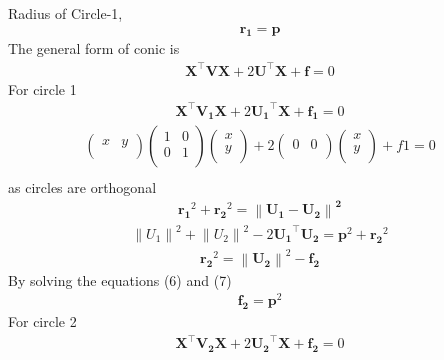 \documentclass[10pt,a4paper]{report}
\providecommand{\norm}[1]{\left\lVert#1\right\rVert}
\let\vec\mathbf
\begin{document}
\begin{multicols}{2}
Radius of Circle-1,
\begin{align}
\vec{r_1=p}
\end{align}
The general form of conic is
\begin{align}
\vec{X}^{\top}\vec{V}\vec{X}+2\vec{U}^{\top}\vec{X}+\vec{f}=0
\end{align}
For circle 1  \\
\begin{align}
\vec{X}^{\top}\vec{V_1}\vec{X}+2\vec{U_1}^{\top}\vec{X}+\vec{f_1}=0
\end{align}
\begin{align}
\begin{pmatrix}x & y \\ \end{pmatrix} 
\begin{pmatrix}
1 & 0\\ 0 & 1 \\
\end{pmatrix}
\begin{pmatrix}x \\ y \\ \end{pmatrix}+2
\begin{pmatrix}0 & 0 \\ \end{pmatrix}
\begin{pmatrix}x \\ y \\ \end{pmatrix}+f1=0 \\
\end{align}
as circles are orthogonal 
\begin{align}
\vec{r_1}^2+\vec{r_2}^2=\vec{\norm{U_1-U_2}^2}
\end{align}
\begin{align}
\norm{U_1}^2+\norm{U_2}^2-2\vec{U_1}^{\top}\vec{U_2}=\vec{p}^2+\vec{r_2}^2
\end{align}
\begin{align}
\vec{r_2}^2=\vec{\norm{U_2}}^2-\vec{f_2}
\end{align}
By solving the equations (6) and (7)
\begin{align}
\vec{f_2}=\vec{p}^2
\end{align}
For circle 2 \\
\begin{align}
\vec{X}^{\top}\vec{V_2}\vec{X}+2\vec{U_2}^{\top}\vec{X}+\vec{f_2}=0
\end{align}


\end{multicols}
\end{document}
